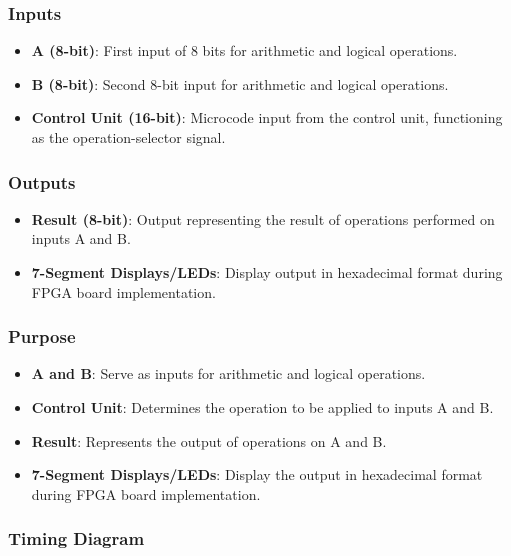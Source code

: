     \subsubsection{{Inputs}}

        \begin{itemize}
            \item   {\textbf{A (8-bit)}: First input of 8 bits for arithmetic and logical operations.}
            \item   {\textbf{B (8-bit)}: Second 8-bit input for arithmetic and logical operations.}
            \item   {\textbf{Control Unit (16-bit)}: Microcode input from the control unit, functioning as the operation-selector signal.}
        \end{itemize}

    \subsubsection{{Outputs}}

        \begin{itemize}
            \item   {\textbf{Result (8-bit)}: Output representing the result of operations performed on inputs A and B.}
            \item   {\textbf{7-Segment Displays/LEDs}: Display output in hexadecimal format during FPGA board implementation.}
        \end{itemize}

    \subsubsection{{Purpose}}

        \begin{itemize}
            \item   {\textbf{A and B}: Serve as inputs for arithmetic and logical operations.}
            \item   {\textbf{Control Unit}: Determines the operation to be applied to inputs A and B.}
            \item   {\textbf{Result}: Represents the output of operations on A and B.}
            \item   {\textbf{7-Segment Displays/LEDs}: Display the output in hexadecimal format during FPGA board implementation.}
        \end{itemize}
    
    \subsubsection{{Timing Diagram}}

